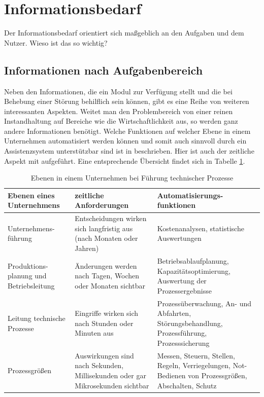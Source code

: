 \section{Informationsbedarf}
Der Informationsbedarf orientiert sich maßgeblich an den Aufgaben und dem Nutzer. Wieso ist das so wichtig? 

\subsection{Informationen nach Aufgabenbereich}
Neben den Informationen, die ein Modul zur Verfügung stellt und die bei Behebung einer Störung behilflich sein können, gibt es eine Reihe von weiteren interessanten Aspekten. Weitet man den Problembereich von einer reinen Instandhaltung auf Bereiche wie die Wirtschaftlichkeit aus, so werden ganz andere Informationen benötigt. Welche Funktionen auf welcher Ebene in einem Unternehmen automatisiert werden können und somit auch sinnvoll durch ein Assistenzsystem unterstützbar sind ist in \cite{Lauber1999} beschrieben. Hier ist auch der zeitliche Aspekt mit aufgeführt. Eine entsprechende Übersicht findet sich in Tabelle \ref{tab:Ebenen-Unternehmen}.
\begin{table}[htbp]
\centering
\caption{Ebenen in einem Unternehmen bei Führung technischer Prozesse}
\label{tab:Ebenen-Unternehmen}
\begin{tabular}{|p{}|p{}|p{}|}
\hline
\textbf{Ebenen eines Unternehmens} & \textbf{zeitliche Anforderungen} & \textbf{Automatisierungs-funktionen} \\
\hline
Unternehmens-führung & Entscheidungen wirken sich langfristig aus (nach Monaten oder Jahren) & Kostenanalysen, statistische Auswertungen \\
\hline
Produktions-planung und Betriebsleitung & Änderungen werden nach Tagen, Wochen oder Monaten sichtbar & Betriebsablaufplanung, Kapazitätsoptimierung, Auswertung der Prozessergebnisse \\
\hline
Leitung technische Prozesse & Eingriffe wirken sich nach Stunden oder Minuten aus & Prozessüberwachung, An- und Abfahrten, Störungsbehandlung, Prozessführung, Prozesssicherung \\
\hline
Prozessgrößen & Auswirkungen sind nach Sekunden, Millisekunden oder gar Mikrosekunden sichtbar & Messen, Steuern, Stellen, Regeln, Verriegelungen, Not-Bedienen von Prozessgrößen, Abschalten, Schutz \\
\hline
\end{tabular}
\end{table}

